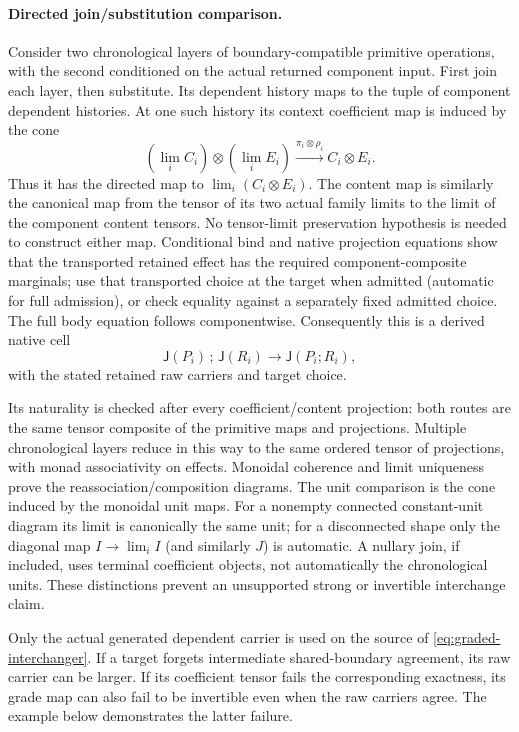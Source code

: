 \documentclass[11pt]{article}
\begin{document}
\paragraph{Directed join/substitution comparison.} Consider two chronological layers of boundary-compatible primitive operations, with the second conditioned on the actual returned component input. First join each layer, then substitute. Its dependent history maps to the tuple of component dependent histories. At one such history its context coefficient map is induced by the cone
\[
 (\lim_i C_i)\otimes(\lim_i E_i)
 \xrightarrow{\pi_i\otimes\rho_i} C_i\otimes E_i.
\]
Thus it has the directed map to $\lim_i(C_i\otimes E_i)$. The content map is similarly the canonical map from the tensor of its two actual family limits to the limit of the component content tensors. No tensor-limit preservation hypothesis is needed to construct either map. Conditional bind and native projection equations show that the transported retained effect has the required component-composite marginals; use that transported choice at the target when admitted (automatic for full admission), or check equality against a separately fixed admitted choice. The full body equation follows componentwise. Consequently this is a derived native cell
\[
 \mathsf J(P_i)\,;\,\mathsf J(R_i)\longrightarrow\mathsf J(P_i;R_i), \tag{JI}\label{eq:graded-interchanger}
\]
with the stated retained raw carriers and target choice.

Its naturality is checked after every coefficient/content projection: both routes are the same tensor composite of the primitive maps and projections. Multiple chronological layers reduce in this way to the same ordered tensor of projections, with monad associativity on effects. Monoidal coherence and limit uniqueness prove the reassociation/composition diagrams. The unit comparison is the cone induced by the monoidal unit maps. For a nonempty connected constant-unit diagram its limit is canonically the same unit; for a disconnected shape only the diagonal map $I\to\lim_i I$ (and similarly $J$) is automatic. A nullary join, if included, uses terminal coefficient objects, not automatically the chronological units. These distinctions prevent an unsupported strong or invertible interchange claim.

Only the actual generated dependent carrier is used on the source of \eqref{eq:graded-interchanger}. If a target forgets intermediate shared-boundary agreement, its raw carrier can be larger. If its coefficient tensor fails the corresponding exactness, its grade map can also fail to be invertible even when the raw carriers agree. The example below demonstrates the latter failure.
\end{document}
